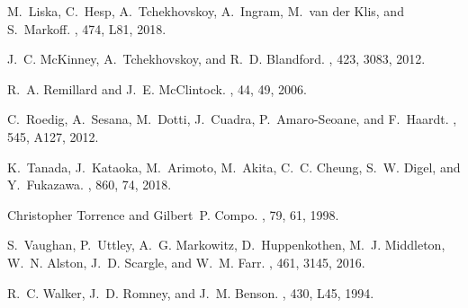 \documentclass{iau}
\begin{document}
\begin{thebibliography}{}
M.~{Liska}, C.~{Hesp}, A.~{Tchekhovskoy}, A.~{Ingram}, M.~{van der Klis}, and
  S.~{Markoff}.
\newblock {\em \mnras}, 474, L81, 2018.

J.~C. {McKinney}, A.~{Tchekhovskoy}, and R.~D. {Blandford}.
\newblock {\em \mnras}, 423, 3083, 2012.

R.~A. {Remillard} and J.~E. {McClintock}.
\newblock {\em \araa}, 44, 49, 2006.

C.~{Roedig}, A.~{Sesana}, M.~{Dotti}, J.~{Cuadra}, P.~{Amaro-Seoane}, and
  F.~{Haardt}.
\newblock {\em \aap}, 545, A127, 2012.

K.~{Tanada}, J.~{Kataoka}, M.~{Arimoto}, M.~{Akita}, C.~C. {Cheung}, S.~W.
  {Digel}, and Y.~{Fukazawa}.
\newblock {\em \apj}, 860, 74, 2018.

Christopher Torrence and Gilbert~P. Compo.
, 79, 61, 1998.

S.~{Vaughan}, P.~{Uttley}, A.~G. {Markowitz}, D.~{Huppenkothen}, M.~J.
  {Middleton}, W.~N. {Alston}, J.~D. {Scargle}, and W.~M. {Farr}.
\newblock {\em \mnras}, 461, 3145, 2016.

R.~C. {Walker}, J.~D. {Romney}, and J.~M. {Benson}.
\newblock {\em \apjl}, 430, L45, 1994.

\end{thebibliography}
\end{document}

